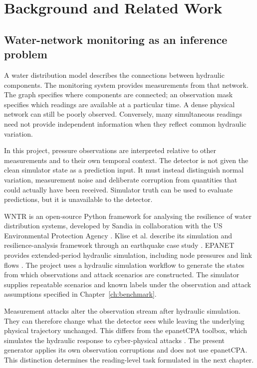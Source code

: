 \chapter{Background and Related Work}
\label{ch:background}

\section{Water-network monitoring as an inference problem}
A water distribution model describes the connections between hydraulic components. The monitoring system provides measurements from that network. The graph specifies where components are connected; an observation mask specifies which readings are available at a particular time. A dense physical network can still be poorly observed. Conversely, many simultaneous readings need not provide independent information when they reflect common hydraulic variation.

In this project, pressure observations are interpreted relative to other measurements and to their own temporal context. The detector is not given the clean simulator state as a prediction input. It must instead distinguish normal variation, measurement noise and deliberate corruption from quantities that could actually have been received. Simulator truth can be used to evaluate predictions, but it is unavailable to the detector.

WNTR is an open-source Python framework for analysing the resilience of water distribution systems, developed by Sandia in collaboration with the US Environmental Protection Agency \cite{wntr}. Klise et al. describe its simulation and resilience-analysis framework through an earthquake case study \cite{klise2017framework}. EPANET provides extended-period hydraulic simulation, including node pressures and link flows \cite{epanet2020}. The project uses a hydraulic simulation workflow to generate the states from which observations and attack scenarios are constructed. The simulator supplies repeatable scenarios and known labels under the observation and attack assumptions specified in Chapter~\ref{ch:benchmark}.

Measurement attacks alter the observation stream after hydraulic simulation. They can therefore change what the detector sees while leaving the underlying physical trajectory unchanged. This differs from the epanetCPA toolbox, which simulates the hydraulic response to cyber-physical attacks \cite{taormina2019epanetcpa}. The present generator applies its own observation corruptions and does not use epanetCPA. This distinction determines the reading-level task formulated in the next chapter.

